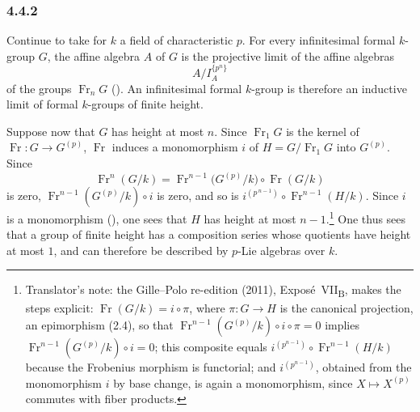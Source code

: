 
\subsubsection*{4.4.2}
\label{sga3:VIIB:4.4.2}

Continue to take for \(k\) a field of characteristic \(p\). For every
infinitesimal formal \(k\)-group \(G\), the affine algebra \(A\) of
\(G\) is the projective limit of the affine algebras
\[
  A/I_A^{\{p^n\}}
\]
of the groups \(\operatorname{Fr}_nG\)
\textup{()}. An infinitesimal formal \(k\)-group is therefore
an inductive limit of formal \(k\)-groups of finite height.

Suppose now that \(G\) has height at most \(n\). Since
\(\operatorname{Fr}_1G\) is the kernel of
\(\operatorname{Fr}:G\to G^{(p)}\), \(\operatorname{Fr}\) induces a
monomorphism \(i\) of \(H=G/\operatorname{Fr}_1G\) into \(G^{(p)}\).
Since
\[
  \operatorname{Fr}^{n}(G/k)
  =
  \operatorname{Fr}^{n-1}\bigl(G^{(p)}/k\bigr)\circ\operatorname{Fr}(G/k)
\]
is zero, \(\operatorname{Fr}^{n-1}(G^{(p)}/k)\circ i\) is zero, and so
is \(i^{(p^{\,n-1})}\circ\operatorname{Fr}^{n-1}(H/k)\). Since \(i\) is a
monomorphism \textup{()}, one sees that \(H\) has height at most
\(n-1\).\footnote{Translator's note: the Gille--Polo re-edition (2011), Expos\'e~VII\textsubscript{B}, makes
the steps explicit: \(\operatorname{Fr}(G/k)=i\circ\pi\), where \(\pi:G\to H\) is the canonical projection,
an epimorphism (2.4), so that \(\operatorname{Fr}^{n-1}(G^{(p)}/k)\circ i\circ\pi=0\) implies
\(\operatorname{Fr}^{n-1}(G^{(p)}/k)\circ i=0\); this composite equals
\(i^{(p^{n-1})}\circ\operatorname{Fr}^{n-1}(H/k)\) because the Frobenius morphism is functorial; and
\(i^{(p^{n-1})}\), obtained from the monomorphism \(i\) by base change, is again a monomorphism, since
\(X\mapsto X^{(p)}\) commutes with fiber products.} One thus sees that a group of finite height has a
composition series whose quotients have height at most \(1\), and can
therefore be described by \(p\)-Lie algebras over \(k\).

